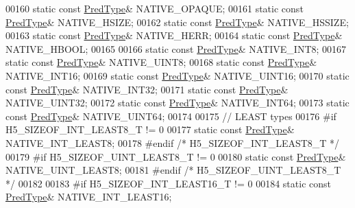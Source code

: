 \begin{DoxyCode}
00160         \textcolor{keyword}{static} \textcolor{keyword}{const} \hyperlink{class_h5_1_1_pred_type}{PredType}& NATIVE\_OPAQUE;
00161         \textcolor{keyword}{static} \textcolor{keyword}{const} \hyperlink{class_h5_1_1_pred_type}{PredType}& NATIVE\_HSIZE;
00162         \textcolor{keyword}{static} \textcolor{keyword}{const} \hyperlink{class_h5_1_1_pred_type}{PredType}& NATIVE\_HSSIZE;
00163         \textcolor{keyword}{static} \textcolor{keyword}{const} \hyperlink{class_h5_1_1_pred_type}{PredType}& NATIVE\_HERR;
00164         \textcolor{keyword}{static} \textcolor{keyword}{const} \hyperlink{class_h5_1_1_pred_type}{PredType}& NATIVE\_HBOOL;
00165 
00166         \textcolor{keyword}{static} \textcolor{keyword}{const} \hyperlink{class_h5_1_1_pred_type}{PredType}& NATIVE\_INT8;
00167         \textcolor{keyword}{static} \textcolor{keyword}{const} \hyperlink{class_h5_1_1_pred_type}{PredType}& NATIVE\_UINT8;
00168         \textcolor{keyword}{static} \textcolor{keyword}{const} \hyperlink{class_h5_1_1_pred_type}{PredType}& NATIVE\_INT16;
00169         \textcolor{keyword}{static} \textcolor{keyword}{const} \hyperlink{class_h5_1_1_pred_type}{PredType}& NATIVE\_UINT16;
00170         \textcolor{keyword}{static} \textcolor{keyword}{const} \hyperlink{class_h5_1_1_pred_type}{PredType}& NATIVE\_INT32;
00171         \textcolor{keyword}{static} \textcolor{keyword}{const} \hyperlink{class_h5_1_1_pred_type}{PredType}& NATIVE\_UINT32;
00172         \textcolor{keyword}{static} \textcolor{keyword}{const} \hyperlink{class_h5_1_1_pred_type}{PredType}& NATIVE\_INT64;
00173         \textcolor{keyword}{static} \textcolor{keyword}{const} \hyperlink{class_h5_1_1_pred_type}{PredType}& NATIVE\_UINT64;
00174 
00175 \textcolor{comment}{// LEAST types}
00176 \textcolor{preprocessor}{#if H5\_SIZEOF\_INT\_LEAST8\_T != 0}
00177         \textcolor{keyword}{static} \textcolor{keyword}{const} \hyperlink{class_h5_1_1_pred_type}{PredType}& NATIVE\_INT\_LEAST8;
00178 \textcolor{preprocessor}{#endif }\textcolor{comment}{/* H5\_SIZEOF\_INT\_LEAST8\_T */}\textcolor{preprocessor}{}
00179 \textcolor{preprocessor}{#if H5\_SIZEOF\_UINT\_LEAST8\_T != 0}
00180         \textcolor{keyword}{static} \textcolor{keyword}{const} \hyperlink{class_h5_1_1_pred_type}{PredType}& NATIVE\_UINT\_LEAST8;
00181 \textcolor{preprocessor}{#endif }\textcolor{comment}{/* H5\_SIZEOF\_UINT\_LEAST8\_T */}\textcolor{preprocessor}{}
00182 
00183 \textcolor{preprocessor}{#if H5\_SIZEOF\_INT\_LEAST16\_T != 0}
00184         \textcolor{keyword}{static} \textcolor{keyword}{const} \hyperlink{class_h5_1_1_pred_type}{PredType}& NATIVE\_INT\_LEAST16;

\end{DoxyCode}
